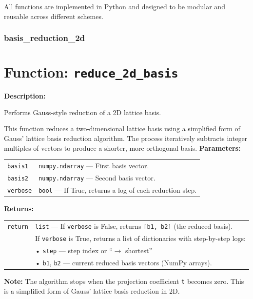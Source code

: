 \documentclass[a4paper,12pt]{article}
\begin{document}
All functions are implemented in Python and designed to be modular and reusable across different schemes.
\subsubsection{basis\_reduction\_2d}

\section*{Function: \texttt{reduce\_2d\_basis}}

\textbf{Description:}

Performs Gauss-style reduction of a 2D lattice basis.

This function reduces a two-dimensional lattice basis using a simplified form
of Gauss' lattice basis reduction algorithm. The process iteratively subtracts
integer multiples of vectors to produce a shorter, more orthogonal basis.
\vspace{1em}
\noindent
\textbf{Parameters:}

\vspace{0.5em}
\begin{tabular}{p{3cm} p{11cm}}
\texttt{basis1} & \texttt{numpy.ndarray} — First basis vector. \\
\texttt{basis2} & \texttt{numpy.ndarray} — Second basis vector. \\
\texttt{verbose} & \texttt{bool} — If True, returns a log of each reduction step. \\
\end{tabular}

\vspace{1em}
\noindent
\newpage
\textbf{Returns:}

\vspace{0.5em}
\begin{tabular}{p{3cm} p{11cm}}
\texttt{return} & \texttt{list} — If \texttt{verbose} is False, returns \texttt{[b1, b2]} (the reduced basis).\\
                & If \texttt{verbose} is True, returns a list of dictionaries with step-by-step logs:\\
                & \quad • \texttt{step} — step index or ``$\rightarrow$ shortest''\\
                & \quad • \texttt{b1}, \texttt{b2} — current reduced basis vectors (NumPy arrays).\\
\end{tabular}

\vspace{1em}
\noindent
\textbf{Note:}  
The algorithm stops when the projection coefficient \texttt{t} becomes zero.  
This is a simplified form of Gauss’ lattice basis reduction in 2D.
\end{document}
